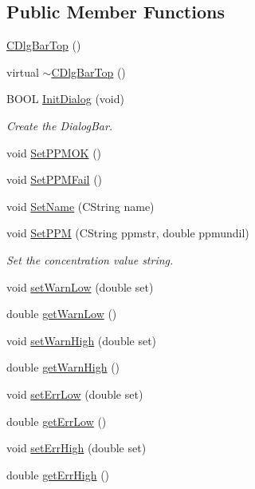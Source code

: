 \subsection*{Public Member Functions}
\begin{DoxyCompactItemize}
\item 
\hyperlink{classCDlgBarTop_aa907772c1d8dcefd11b98e880d621c7d}{CDlgBarTop} ()
\item 
virtual \hyperlink{classCDlgBarTop_a4e7873aef6a3d59fe9bf8d3f30a7ca8a}{$\sim$CDlgBarTop} ()
\item 
BOOL \hyperlink{classCDlgBarTop_a9089c7ece5a6418693257770186ab264}{InitDialog} (void)
\begin{DoxyCompactList}\small\item\em Create the DialogBar. \item\end{DoxyCompactList}\item 
void \hyperlink{classCDlgBarTop_a7753f7640fe138620298f9a28a72795f}{SetPPMOK} ()
\item 
void \hyperlink{classCDlgBarTop_a9b13b337d8d91f72e7104eeeb6be28a2}{SetPPMFail} ()
\item 
void \hyperlink{classCDlgBarTop_ad7a4fe808c9e5702fe91b63d4015a164}{SetName} (CString name)
\item 
void \hyperlink{classCDlgBarTop_a0bf1b949234eeddfed2c1bf60689ccab}{SetPPM} (CString ppmstr, double ppmundil)
\begin{DoxyCompactList}\small\item\em Set the concentration value string. \item\end{DoxyCompactList}\item 
void \hyperlink{classCDlgBarTop_af4f525fec382d292f3b2ae6870233763}{setWarnLow} (double set)
\item 
double \hyperlink{classCDlgBarTop_a96fa46a8b1b6951ff0eb7ebaecfec30a}{getWarnLow} ()
\item 
void \hyperlink{classCDlgBarTop_a7d1c4de341b7f0e1503fcf65fedf3af0}{setWarnHigh} (double set)
\item 
double \hyperlink{classCDlgBarTop_a05cf772076ae641fbdcb9ad18789b324}{getWarnHigh} ()
\item 
void \hyperlink{classCDlgBarTop_a0621b595de33f5770f5210134bd9d673}{setErrLow} (double set)
\item 
double \hyperlink{classCDlgBarTop_aa0026b52d01225c2df4f63b8b8d183ac}{getErrLow} ()
\item 
void \hyperlink{classCDlgBarTop_aa3ddd98b1056296375b93f280bd85c4d}{setErrHigh} (double set)
\item 
double \hyperlink{classCDlgBarTop_a98822b7f89d0534286dae093914a8c53}{getErrHigh} ()
\end{DoxyCompactItemize}
